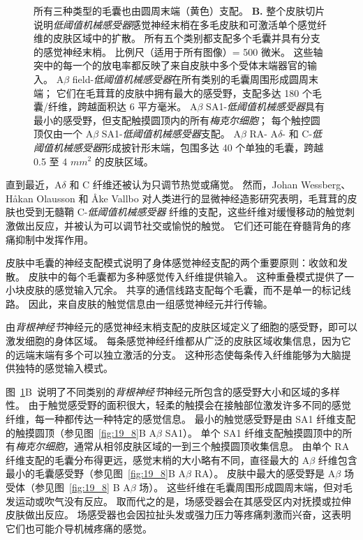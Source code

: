 \begin{figure}[htbp]
{		所有三种类型的毛囊也由圆周末端（黄色）支配\cite{zimmerman2014gentle}。
		\textbf{B.} 整个皮肤切片说明\textit{低阈值机械感受器}感觉神经末梢在多毛皮肤和可激活单个感觉纤维的皮肤区域中的扩散。
		所有五个类别都支配多个毛囊并具有分支的感觉神经末梢。
		比例尺（适用于所有图像）= 500 微米。 
		这些轴突中的每一个的放电率都反映了来自皮肤中多个受体末端器官的输入。
		A$\beta$ field-\textit{低阈值机械感受器}在所有类别的毛囊周围形成圆周末端； 它们在毛茸茸的皮肤中拥有最大的感受野，支配多达 180 个毛囊/纤维，跨越面积达 6 平方毫米。
		A$\beta$ SA1-\textit{低阈值机械感受器}具有最小的感受野，但支配触摸圆顶内的所有\textit{梅克尔细胞}；
		每个触控圆顶仅由一个 A$\beta$ SA1-\textit{低阈值机械感受器}支配。
		A$\beta$ RA- A$\delta$- 和 C-\textit{低阈值机械感受器}形成披针形末端，包围多达 40 个单独的毛囊，跨越 0.5 至 4 $ mm^2 $ 的皮肤区域\cite{bai2015genetic}。}
	\label{fig:18_8}
\end{figure}


直到最近，A$\delta$ 和 C 纤维还被认为只调节热觉或痛觉。
然而，Johan Wessberg、Håkan Olausson 和 Åke Vallbo 对人类进行的显微神经造影研究表明，毛茸茸的皮肤也受到无髓鞘 C-\textit{低阈值机械感受器} 纤维的支配，这些纤维对缓慢移动的触觉刺激做出反应，并被认为可以调节社交或愉悦的触觉。
它们还可能在脊髓背角的疼痛抑制中发挥作用。


皮肤中毛囊的神经支配模式说明了身体感觉神经支配的两个重要原则：收敛和发散。
皮肤中的每个毛囊都为多种感觉传入纤维提供输入。
这种重叠模式提供了一小块皮肤的感觉输入冗余。
共享的通信线路支配每个毛囊，而不是单一的标记线路。 
因此，来自皮肤的触觉信息由一组感觉神经元并行传输。


由\textit{背根神经节}神经元的感觉神经末梢支配的皮肤区域定义了细胞的感受野，即可以激发细胞的身体区域。
每条感觉神经纤维都从广泛的皮肤区域收集信息，因为它的远端末端有多个可以独立激活的分支。
这种形态使每条传入纤维能够为大脑提供独特的感觉输入模式。


图~\ref{fig:18_8}B~说明了不同类别的\textit{背根神经节}神经元所包含的感受野大小和区域的多样性。
由于触觉感受野的面积很大，轻柔的触摸会在接触部位激发许多不同的感觉纤维，每一种都传达一种特定的感觉信息。
最小的触觉感受野是由 SA1 纤维支配的触摸圆顶（参见图~\ref{fig:19_8}B A$\beta$ SA1）。
单个 SA1 纤维支配触摸圆顶中的所有\textit{梅克尔细胞}，通常从相邻皮肤区域的一到三个触摸圆顶收集信息。
由单个 RA 纤维支配的毛囊分布得更远，感觉末梢的大小略有不同，直径最大的 A$\beta$ 纤维包含最小的毛囊感受野（参见图~\ref{fig:19_8}B A$\beta$ RA）。
皮肤中最大的感受野是 A$\beta$ 场受体（参见图~\ref{fig:19_8} B A$\beta$ 场）。
这些纤维在毛囊周围形成圆周末端，但对毛发运动或吹气没有反应。
取而代之的是，场感受器会在其感受区内对抚摸或拉伸皮肤做出反应。
场感受器也会因拉扯头发或强力压力等疼痛刺激而兴奋，这表明它们也可能介导机械疼痛的感觉。



